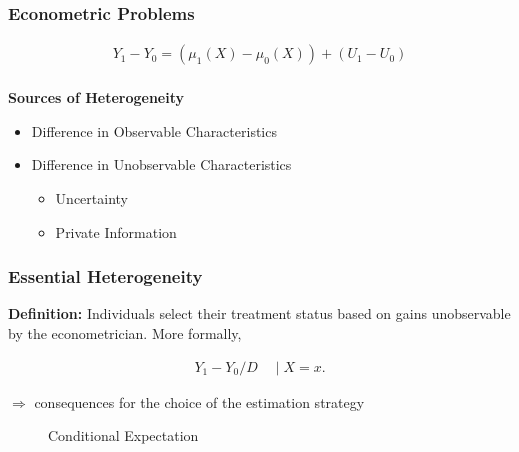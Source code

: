 \begin{frame}
\frametitle{Econometric Problems}

\begin{align*}
Y_1 - Y_0 = (\mu_1(X) - \mu_0(X)) + (U_1 - U_0)\\
\end{align*}

\textbf{Sources of Heterogeneity}
\begin{itemize}
	\item Difference in Observable Characteristics
	\item Difference in Unobservable Characteristics
	\begin{itemize}
		\item  Uncertainty
		\item Private Information
	\end{itemize}
\end{itemize}

\end{frame}


\begin{frame}
\frametitle{Essential Heterogeneity}

\textbf{Definition:} Individuals select their treatment status based on
gains unobservable by the econometrician. More formally,

\begin{align*}
Y_1 - Y_0 / D\quad \mid X = x.
\end{align*}

\(\Rightarrow\) consequences for the choice of the estimation strategy

\end{frame}


\begin{frame}

\begin{figure}[htp]\centering
	\caption{Conditional Expectation}\label{eh-Conditional Expectation}
\end{figure}

\end{frame}




